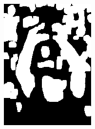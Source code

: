 \begin{figure}[h]
{\begin{subfigure}[b]{0.23\textwidth}
         \includegraphics[width=\textwidth]{images/results/cross/att-massu_ecu_sch_y.png}
     \end{subfigure}
    \hfill
     \begin{subfigure}[b]{0.23\textwidth}
         \centering

\end{subfigure}}
\end{figure}
